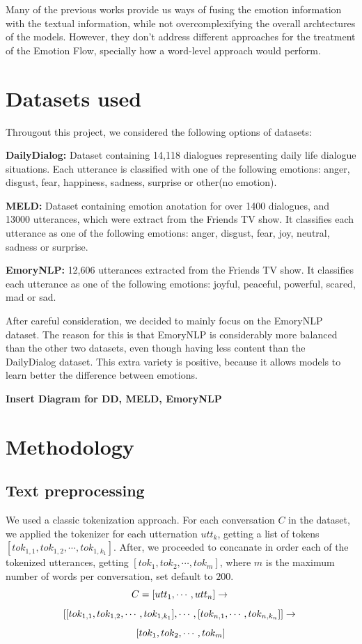 \documentclass[oneside, a4paper, onecolumn, 11pt]{article}
\begin{document}
Many of the previous works provide us ways of fusing the emotion information with the textual information, while not overcomplexifying the overall 
archtectures of the models. However, they don't address different approaches for the treatment of the Emotion Flow, specially how a word-level approach
would perform.




\section{Datasets used}

Througout this project, we considered the following options of datasets:

\textbf{DailyDialog: } \cite{li2017dailydialogmanuallylabelledmultiturn} Dataset containing 14,118 dialogues representing daily life dialogue situations. Each 
utterance is classified with one of the following emotions: anger, disgust, fear, happiness, sadness, surprise or other(no emotion).

\textbf{MELD: } \cite{poria2019meldmultimodalmultipartydataset} Dataset containing emotion anotation for over 1400 dialogues, and 13000 utterances, which were extract
from the Friends TV show. It classifies each utterance as one of the following emotions: anger, disgust, fear, joy, neutral, sadness or surprise.

\textbf{EmoryNLP: } \cite{zahiri2017emotiondetectiontvtranscripts} 12,606 utterances extracted from the Friends TV show. It classifies each utterance as one of the following
emotions: joyful, peaceful, powerful, scared, mad or sad.

After careful consideration, we decided to mainly focus on the EmoryNLP dataset. The reason for this is that EmoryNLP is considerably more balanced than the other two 
datasets, even though having less content than the DailyDialog dataset. This extra variety is positive, because it allows models to learn better the difference between
emotions.

\textbf{Insert Diagram for DD, MELD, EmoryNLP}

\section{Methodology}


\subsection{Text preprocessing}
We used a classic tokenization approach. For each conversation $C$ in the dataset, we applied the tokenizer for each utternation $utt_k$, getting a list of tokens
$[tok_{1,1},tok_{1,2},\cdots, tok_{1,k_1}]$. After, we proceeded to concanate in order each of the tokenized utterances, getting  $[tok_1,tok_2, \cdots, tok_m]$,
where $m$ is the maximum number of words per conversation, set default to $200$.
  $$
  C = [utt_1, \cdots, utt_n] \to \\
  $$
  $$
  [[tok_{1,1},tok_{1,2},\cdots, tok_{1,k_1}], \cdots , [tok_{n,1},\cdots,tok_{n,k_n}]] \to \\
  $$
  $$
  [tok_1,tok_2, \cdots, tok_m]  \\
$$
\end{document}

